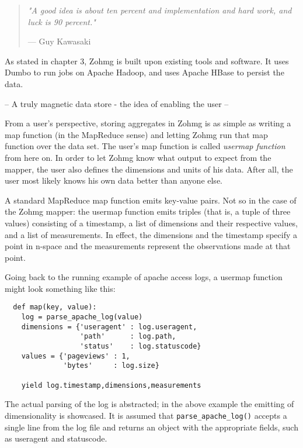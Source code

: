 \documentclass[a4paper,10pt]{book}
\newcommand{\chapterquote}[2] {
\begin{quote}
\textit{"{#1}"}

--- {#2}
\end{quote}

\vspace{24pt}
}
\begin{document}
\chapterquote{A good idea is about ten percent and implementation and hard
work, and luck is 90 percent.}{Guy Kawasaki}

As stated in chapter 3, Zohmg is built upon existing tools and software. It
uses Dumbo to run jobs on Apache Hadoop, and uses Apache HBase to persist the
data.



-- A truly magnetic data store - the idea of enabling the user --

From a user's perspective, storing aggregates in Zohmg is as simple as writing
a map function (in the MapReduce sense) and letting Zohmg run that map function
over the data set. The user's map function is called \textit{usermap function}
from here on. In order to let Zohmg know what output to expect from the mapper,
the user also defines the dimensions and units of his data. After all, the user
most likely knows his own data better than anyone else.

A standard MapReduce map function emits key-value pairs. Not so in the case of
the Zohmg mapper: the usermap function emits triples (that is, a tuple of three
values) consisting of a timestamp, a list of dimensions and their respective
values, and a list of measurements. In effect, the dimensions and the timestamp
specify a point in n-space and the measurements represent the observations made
at that point.

Going back to the running example of apache access logs, a usermap function
might look something like this:

\begin{verbatim}
  def map(key, value):
    log = parse_apache_log(value)
    dimensions = {'useragent' : log.useragent,
                  'path'      : log.path,
                  'status'    : log.statuscode}
    values = {'pageviews' : 1,
              'bytes'     : log.size}

    yield log.timestamp,dimensions,measurements
\end{verbatim}

\vspace{12pt}

The actual parsing of the log is abstracted; in the above example the
emitting of dimensionality is showcased. It is assumed that
\texttt{parse\_apache\_log()} accepts a single line from the log file and
returns an object with the appropriate fields, such as useragent and
statuscode.
\end{document}
